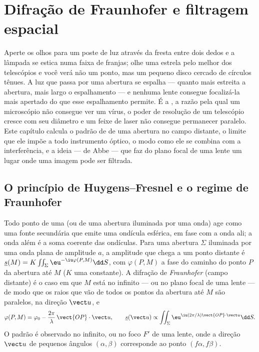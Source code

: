 \chapter{Difração de Fraunhofer e filtragem espacial}\label{ch:b2:diffraction}

Aperte os olhos para um poste de luz através da fresta entre dois dedos e a
lâmpada se estica numa faixa de franjas; olhe uma estrela pelo
melhor dos telescópios e você verá não um ponto, mas um pequeno disco cercado
de círculos tênues. A luz que passa por uma abertura se espalha --- quanto
mais estreita a abertura, mais largo o espalhamento --- e nenhuma lente consegue
focalizá-la mais apertado do que esse espalhamento permite. É a
\emph{}, a razão pela qual um microscópio não consegue ver um vírus, o
poder de resolução de um telescópio cresce com seu diâmetro e um feixe de
laser não consegue permanecer paralelo. Este capítulo calcula o padrão de
 de uma abertura no campo distante, o limite que ele impõe a todo
instrumento óptico, o modo como ele se combina com a interferência, e a
ideia --- de Abbe --- que faz do plano focal de uma lente um lugar onde uma
imagem pode ser filtrada.

\section{O princípio de Huygens--Fresnel e o regime de Fraunhofer}

\begin{definition}\label{def:b2:diffraction:huygens}
Todo ponto de uma  (ou de uma abertura iluminada por uma onda) age como
uma fonte secundária que emite uma ondícula esférica, em fase com a onda
ali; a onda além é a soma coerente das ondículas. Para uma
abertura $\Sigma$ iluminada por uma onda plana de amplitude $a$, a amplitude
que chega a um ponto distante é $\underline s(M) = K\iint_\Sigma\eu^{-\iu\varphi(P, M)}\dd S$, com
$\varphi(P, M)$ a fase do caminho do ponto $P$ da abertura até $M$
($K$ uma constante). A difração de \emph{Fraunhofer} (campo distante) é o caso
em que $M$ está no infinito --- ou no plano focal de uma lente --- de modo que
os raios que vão de todos os pontos da abertura até $M$ são paralelos, na
direção $\vect u$, e
\[
\varphi(P, M) = \varphi_0 - \frac{2\pi}\lambda\,\vect{OP}\cdot\vect u , \qquad
\underline s(\vect u) \propto \iint_\Sigma\eu^{\iu(2\pi/\lambda)\vect{OP}\cdot\vect u}\dd S .
\]
O padrão é observado no infinito, ou no foco $F'$ de uma lente,
onde a direção $\vect u$ de pequenos ângulos $(\alpha, \beta)$ corresponde ao
ponto $(f\alpha, f\beta)$.
\end{definition}
\admitted

